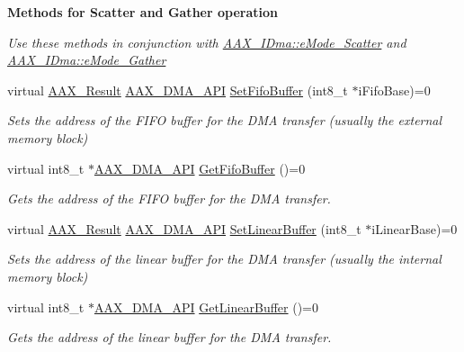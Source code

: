 \begin{Indent}\textbf{ Methods for Scatter and Gather operation}\par
{\em Use these methods in conjunction with \mbox{\hyperlink{a01809_af8d0f19f2896dd6dbd126b919b24e39bac8f3cbed92bc7d135e306cc154ac2ae6}{A\+A\+X\+\_\+\+I\+Dma\+::e\+Mode\+\_\+\+Scatter}} and \mbox{\hyperlink{a01809_af8d0f19f2896dd6dbd126b919b24e39badec2b76540ba9a168b7a049acb50654d}{A\+A\+X\+\_\+\+I\+Dma\+::e\+Mode\+\_\+\+Gather}} }\begin{DoxyCompactItemize}
\item 
virtual \mbox{\hyperlink{a00392_a4d8f69a697df7f70c3a8e9b8ee130d2f}{A\+A\+X\+\_\+\+Result}} \mbox{\hyperlink{a00587_acae60d01e5e4bd3282369d0d9d378f3f}{A\+A\+X\+\_\+\+D\+M\+A\+\_\+\+A\+PI}} \mbox{\hyperlink{a01809_afeda3af6b2c5da7a8b2759aa9429c7dc}{Set\+Fifo\+Buffer}} (int8\+\_\+t $\ast$i\+Fifo\+Base)=0
\begin{DoxyCompactList}\small\item\em Sets the address of the F\+I\+FO buffer for the D\+MA transfer (usually the external memory block) \end{DoxyCompactList}\item 
virtual int8\+\_\+t $\ast$\mbox{\hyperlink{a00587_acae60d01e5e4bd3282369d0d9d378f3f}{A\+A\+X\+\_\+\+D\+M\+A\+\_\+\+A\+PI}} \mbox{\hyperlink{a01809_af5c4988d5f844b219077773e4e810d64}{Get\+Fifo\+Buffer}} ()=0
\begin{DoxyCompactList}\small\item\em Gets the address of the F\+I\+FO buffer for the D\+MA transfer. \end{DoxyCompactList}\item 
virtual \mbox{\hyperlink{a00392_a4d8f69a697df7f70c3a8e9b8ee130d2f}{A\+A\+X\+\_\+\+Result}} \mbox{\hyperlink{a00587_acae60d01e5e4bd3282369d0d9d378f3f}{A\+A\+X\+\_\+\+D\+M\+A\+\_\+\+A\+PI}} \mbox{\hyperlink{a01809_ad0c409f61f989e72f6afd47cb02b108e}{Set\+Linear\+Buffer}} (int8\+\_\+t $\ast$i\+Linear\+Base)=0
\begin{DoxyCompactList}\small\item\em Sets the address of the linear buffer for the D\+MA transfer (usually the internal memory block) \end{DoxyCompactList}\item 
virtual int8\+\_\+t $\ast$\mbox{\hyperlink{a00587_acae60d01e5e4bd3282369d0d9d378f3f}{A\+A\+X\+\_\+\+D\+M\+A\+\_\+\+A\+PI}} \mbox{\hyperlink{a01809_a5a23f32e268d310ea6c80049c1661982}{Get\+Linear\+Buffer}} ()=0
\begin{DoxyCompactList}\small\item\em Gets the address of the linear buffer for the D\+MA transfer. \end{DoxyCompactList}\item 

\end{DoxyCompactItemize}
\end{Indent}

